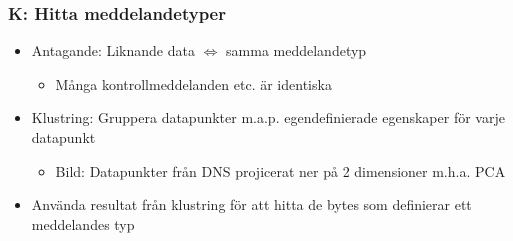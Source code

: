\documentclass[xetex, 8pt]{beamer}
\begin{document}
    \begin{frame}
        \frametitle{K: Hitta meddelandetyper}
        \begin{itemize}
            \item Antagande: Liknande data $\Leftrightarrow$ samma meddelandetyp
                \begin{itemize}
                    \item Många kontrollmeddelanden etc. är identiska
                \end{itemize}
            \item Klustring: Gruppera datapunkter m.a.p. egendefinierade egenskaper
                för varje datapunkt
                \begin{itemize}
                    \item Bild: Datapunkter från DNS projicerat ner på 2 dimensioner m.h.a. PCA
                \end{itemize}
            \item Använda resultat från klustring för att hitta de bytes som
                definierar ett meddelandes typ
        \end{itemize}
    \end{frame}
\end{document}
